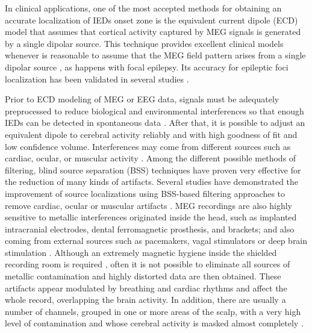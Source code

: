 In clinical applications, one of the most accepted methods for obtaining an accurate localization of IEDs onset zone is the equivalent current dipole (ECD) model \citep{Anderson2014} that assumes that cortical activity captured by MEG signals is generated by a single dipolar source. This technique provides excellent clinical models whenever is reasonable to assume that the MEG field pattern arises from a single dipolar source \citep{Lutkenhoner1998}, as happens with focal epilepsy. Its accuracy for epileptic foci localization has been validated in several studies \citep{Stefan2003,Fischer2005,Oishi2006}.

Prior to ECD modeling of MEG or EEG data, signals must be adequately preprocessed to reduce biological and environmental interferences so that enough IEDs can be detected in spontaneous data \citep{Bagic2011}. After that, it is possible to adjust an equivalent dipole to cerebral activity reliably and with high goodness of fit and low confidence volume. Interferences may come from different sources such as cardiac, ocular, or muscular activity \citep{Stufflebeam2009}. Among the different possible methods of filtering, blind source separation (BSS) techniques have proven very effective for the reduction of many kinds of artifacts. Several studies have demonstrated the improvement of source localizations using BSS-based filtering approaches to remove cardiac, ocular or muscular artifacts \citep{Mantini2008,Fatima2013}. MEG recordings are also highly sensitive to metallic interferences originated inside the head, such as implanted intracranial electrodes, dental ferromagnetic prosthesis, and brackets; and also coming from external sources such as pacemakers, vagal stimulators \citep{Vrba2002} or deep brain stimulation \citep{Airaksinen2011}. Although an extremely magnetic hygiene inside the shielded recording room is required \citep{Hillebrand2013}, often it is not possible to eliminate all sources of metallic contamination and highly distorted data are then obtained. These artifacts appear modulated by breathing and cardiac rhythms and affect the whole record, overlapping the brain activity. In addition, there are usually a number of channels, grouped in one or more areas of the scalp, with a very high level of contamination and whose cerebral activity is masked almost completely \citep{Migliorelli2015}.

